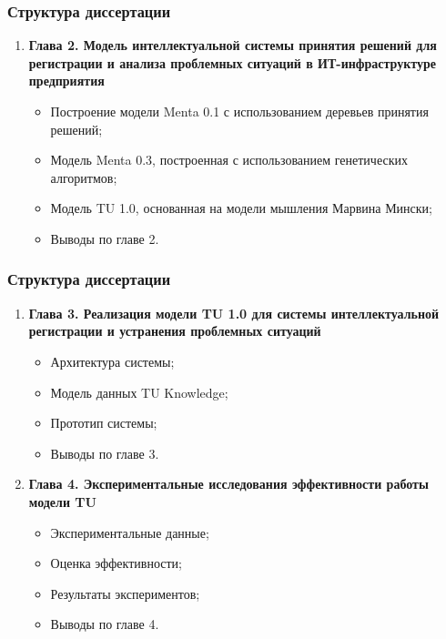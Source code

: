 \documentclass[14pt]{beamer}
\begin{document}
\begin{frame}
\frametitle{Структура диссертации}
\begin{enumerate}
  \item \textbf{Глава 2. Модель интеллектуальной системы принятия решений для регистрации и анализа проблемных ситуаций в ИТ-инфраструктуре предприятия}
  \begin{itemize}
    \item Построение модели Menta 0.1 с использованием деревьев принятия решений;
    \item Модель Menta 0.3, построенная с использованием генетических алгоритмов;
    \item Модель TU 1.0, основанная на модели мышления Марвина Мински;
    \item Выводы по главе 2.
  \end{itemize}
\end{enumerate}
\end{frame}

\begin{frame}
\frametitle{Структура диссертации}
\begin{enumerate}
  \item \textbf{Глава 3. Реализация модели TU 1.0 для системы интеллектуальной регистрации и устранения проблемных ситуаций}
  \begin{itemize}
    \item Архитектура системы;
    \item Модель данных TU Knowledge;
    \item Прототип системы;
    \item Выводы по главе 3.
  \end{itemize}
   \item \textbf{Глава 4. Экспериментальные исследования эффективности работы модели TU}
  \begin{itemize}
    \item Экспериментальные данные;
    \item Оценка эффективности;
    \item Результаты экспериментов;
    \item Выводы по главе 4.
  \end{itemize}

\end{enumerate}
\end{frame}
\end{document}
